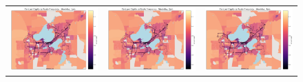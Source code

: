 \documentclass[letter]{article}
\begin{document}
\begin{figure}
\begin{center}
\begin{tabular}{ c c c }
        
          \includegraphics[width=60mm]{CarOwnershipVSfrequency1pm.png}   & \includegraphics[width=60mm]{CarOwnershipVSfrequency2pm.png}  & \includegraphics[width=60mm]{CarOwnershipVSfrequency3pm.png}  \\
 

\end{tabular}
\end{center}
\end{figure}
\end{document}

